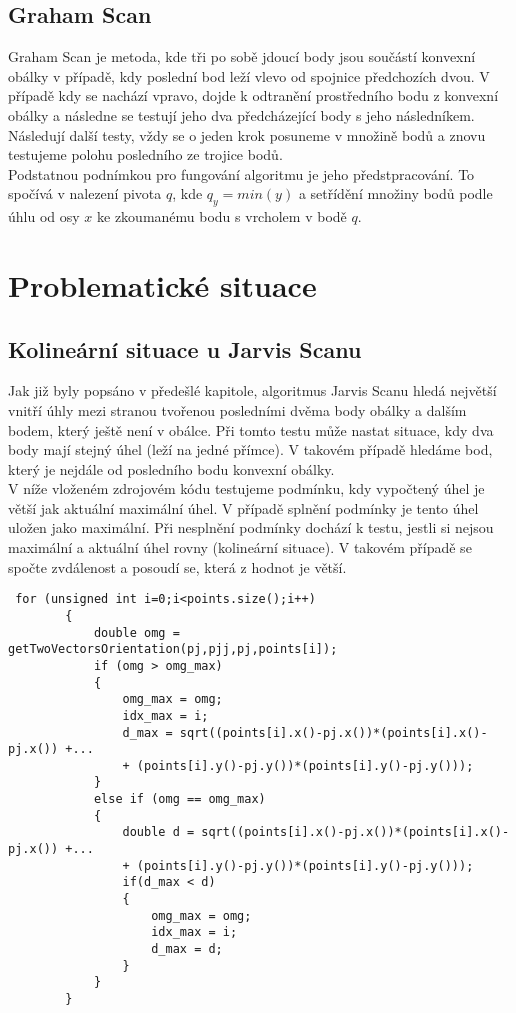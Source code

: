 \documentclass{article}
\begin{document}
\subsection{Graham Scan}
Graham Scan je metoda, kde tři po sobě jdoucí body jsou součástí konvexní obálky v případě, kdy poslední bod leží vlevo od spojnice předchozích dvou. V případě kdy se nachází vpravo, dojde k odtranění prostředního bodu z konvexní obálky a následne se testují jeho dva předcházející body s jeho následníkem. Následují další testy, vždy se o jeden krok posuneme v množině bodů a znovu testujeme polohu posledního ze trojice bodů.\\

Podstatnou podnímkou pro fungování algoritmu je jeho předstpracování. To spočívá v nalezení pivota $q$, kde $q_y=min(y)$ a setřídění množiny bodů podle úhlu od osy $x$ ke zkoumanému bodu s vrcholem v bodě $q$.

\newpage
\section{Problematické situace}
\subsection{Kolineární situace u Jarvis Scanu}
Jak již byly popsáno v předešlé kapitole, algoritmus Jarvis Scanu hledá největší vnitří úhly mezi stranou tvořenou posledními dvěma body obálky a dalším bodem, který ještě není v obálce. Při tomto testu může nastat situace, kdy dva body mají stejný úhel (leží na jedné přímce). V takovém případě hledáme bod, který je nejdále od posledního bodu konvexní obálky.\\

V níže vloženém zdrojovém kódu testujeme podmínku, kdy vypočtený úhel je větší jak aktuální maximální úhel. V případě splnění podmínky je tento úhel uložen jako maximální. Při nesplnění podmínky dochází k testu, jestli si nejsou maximální a aktuální úhel rovny (kolineární situace). V takovém případě se spočte zvdálenost a posoudí se, která z hodnot je větší.\\
 
\begin{lstlisting}
 for (unsigned int i=0;i<points.size();i++)
        {
            double omg = getTwoVectorsOrientation(pj,pjj,pj,points[i]);
            if (omg > omg_max)
            {
                omg_max = omg;
                idx_max = i;
                d_max = sqrt((points[i].x()-pj.x())*(points[i].x()-pj.x()) +...
                + (points[i].y()-pj.y())*(points[i].y()-pj.y()));
            }
            else if (omg == omg_max)
            {
                double d = sqrt((points[i].x()-pj.x())*(points[i].x()-pj.x()) +...
                + (points[i].y()-pj.y())*(points[i].y()-pj.y()));
                if(d_max < d)
                {
                    omg_max = omg;
                    idx_max = i;
                    d_max = d;
                }
            }
        }
\end{lstlisting}
\newpage
\end{document}
